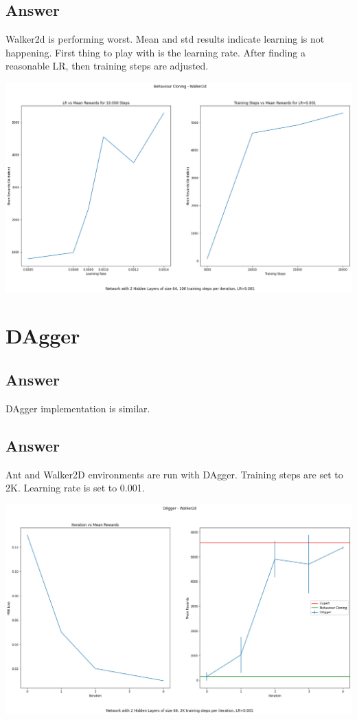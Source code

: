 \documentclass[11pt]{article}
\begin{document}
    \subsection{Answer}

    Walker2d is performing worst.
    Mean and std results indicate learning is not happening.
    First thing to play with is the learning rate.
    After finding a reasonable LR, then training steps are adjusted.

    \hspace*{-1.0in}
    \includegraphics[scale=0.4]{q1.3_plots}

    \section{DAgger}

    \subsection{Answer}

    DAgger implementation is similar.

    \subsection{Answer}

    Ant and Walker2D environments are run with DAgger.
    Training steps are set to 2K. Learning rate is set to 0.001.

    \hspace*{-1.0in}
    \includegraphics[scale=0.35]{q2.2.1_plots}
\end{document}
